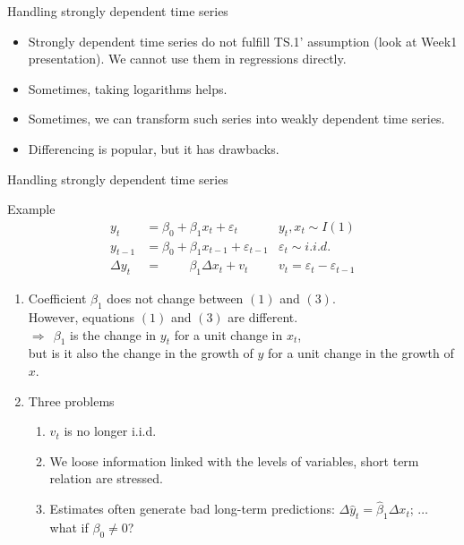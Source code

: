 \documentclass{beamer}
\begin{document}
\begin{frame}{Handling strongly dependent time series}
\begin{itemize}
\item Strongly dependent time series do not fulfill TS.1' assumption (look at Week1 presentation). We cannot use them in regressions directly.
\vspace{0.5cm}
\item Sometimes, taking logarithms helps.
\vspace{0.5cm}
\item Sometimes, we can transform such series into weakly dependent time series.
\vspace{0.5cm}
\item Differencing is popular, but it has drawbacks.
\end{itemize}
\end{frame}

\begin{frame}{Handling strongly dependent time series}
\vspace{-0.5cm}
\begin{block}{Example}
\vspace{-0.5cm}
\begin{align} 
y_t & = \beta_0 + \beta_1 x_t + \varepsilon_t & y_t, x_t \sim I(1) \\
y_{t-1} & = \beta_0 + \beta_1 x_{t-1} + \varepsilon_{t-1} & \varepsilon_t \sim i.i.d. \\
\Delta y_t & = \qquad \, \beta_1\Delta x_t + v_t  & v_t= \varepsilon_t - \varepsilon_{t-1}
\end{align}
\end{block}
\begin{enumerate}
\item Coefficient $\beta_1$ does not change between $(1)$ and $(3)$.
\\ However, equations $(1)$ and $(3)$ are different.
\\$\Rightarrow~~\beta_1$ is the change in $y_t$ for a unit change in $x_t$, \\but is it also the change in the growth of $y$ for a unit change in the growth of $x$.
\item Three problems 
\begin{enumerate}
\item $v_t$ is no longer i.i.d.
\item We loose information linked with the levels of variables, short term relation are stressed.
\item Estimates often generate bad long-term predictions: 
$ \Delta \hat{y}_t = \hat{\beta}_1 \Delta x_t$; $ \dots $ what if $\beta_0 \neq 0$? 
\end{enumerate}
\end{enumerate}
\end{frame}
\end{document}
